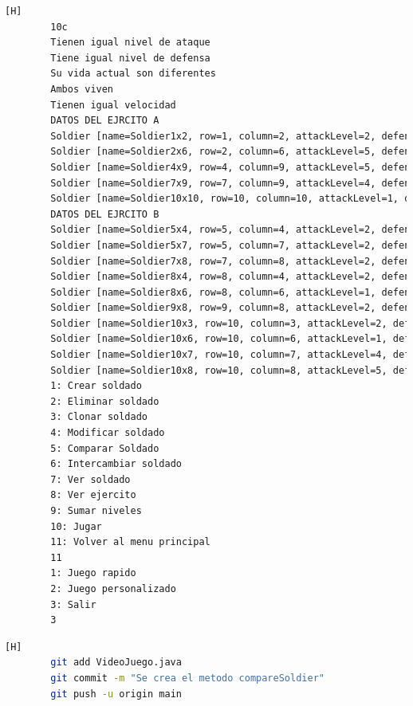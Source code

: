 \documentclass{article}
\begin{document}
\begin{lstlisting}[language=bash,caption={Compilando y probando el metodo compareSoldier  }][H]
		10c
		Tienen igual nivel de ataque
		Tiene igual nivel de defensa
		Su vida actual son diferentes
		Ambos viven
		Tienen igual velocidad
		DATOS DEL EJRCITO A
		Soldier [name=Soldier1x2, row=1, column=2, attackLevel=2, defenseLevel=3, actualLife=5, speed=0, attitude=Repose, current=true]
		Soldier [name=Soldier2x6, row=2, column=6, attackLevel=5, defenseLevel=1, actualLife=2, speed=0, attitude=Repose, current=true]
		Soldier [name=Soldier4x9, row=4, column=9, attackLevel=5, defenseLevel=4, actualLife=4, speed=0, attitude=Repose, current=true]
		Soldier [name=Soldier7x9, row=7, column=9, attackLevel=4, defenseLevel=2, actualLife=4, speed=0, attitude=Repose, current=true]
		Soldier [name=Soldier10x10, row=10, column=10, attackLevel=1, defenseLevel=1, actualLife=3, speed=0, attitude=Repose, current=true]
		DATOS DEL EJRCITO B
		Soldier [name=Soldier5x4, row=5, column=4, attackLevel=2, defenseLevel=1, actualLife=5, speed=0, attitude=Repose, current=true]
		Soldier [name=Soldier5x7, row=5, column=7, attackLevel=2, defenseLevel=1, actualLife=1, speed=0, attitude=Repose, current=true]
		Soldier [name=Soldier7x8, row=7, column=8, attackLevel=2, defenseLevel=1, actualLife=4, speed=0, attitude=Repose, current=true]
		Soldier [name=Soldier8x4, row=8, column=4, attackLevel=2, defenseLevel=4, actualLife=4, speed=0, attitude=Repose, current=true]
		Soldier [name=Soldier8x6, row=8, column=6, attackLevel=1, defenseLevel=4, actualLife=2, speed=0, attitude=Repose, current=true]
		Soldier [name=Soldier9x8, row=9, column=8, attackLevel=2, defenseLevel=4, actualLife=3, speed=0, attitude=Repose, current=true]
		Soldier [name=Soldier10x3, row=10, column=3, attackLevel=2, defenseLevel=1, actualLife=4, speed=0, attitude=Repose, current=true]
		Soldier [name=Soldier10x6, row=10, column=6, attackLevel=1, defenseLevel=3, actualLife=1, speed=0, attitude=Repose, current=true]
		Soldier [name=Soldier10x7, row=10, column=7, attackLevel=4, defenseLevel=5, actualLife=5, speed=0, attitude=Repose, current=true]
		Soldier [name=Soldier10x8, row=10, column=8, attackLevel=5, defenseLevel=2, actualLife=3, speed=0, attitude=Repose, current=true]
		1: Crear soldado
		2: Eliminar soldado
		3: Clonar soldado
		4: Modificar soldado
		5: Comparar Soldado
		6: Intercambiar soldado
		7: Ver soldado
		8: Ver ejercito
		9: Sumar niveles
		10: Jugar
		11: Volver al menu principal
		11
		1: Juego rapido
		2: Juego personalizado
		3: Salir
		3
	\end{lstlisting}
	
	\begin{lstlisting}[language=bash,caption={Commit: 9d78c3620d8f037fa789e96d6367c1c0f8d2a075}][H]
		git add VideoJuego.java
		git commit -m "Se crea el metodo compareSoldier"			
		git push -u origin main
	\end{lstlisting}
	
\end{document}
